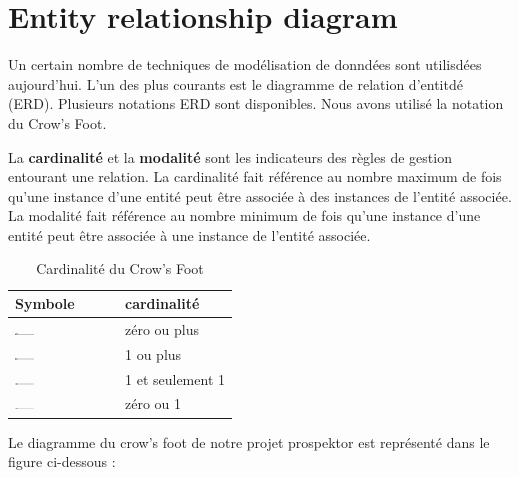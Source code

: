 \section{Entity relationship diagram}
Un certain nombre de techniques de mod\'elisation de donnd\'ees sont utilisd\'ees aujourd'hui. L'un des plus courants est le diagramme de relation d'entitd\'e (\gls{ERD}). Plusieurs notations \gls{ERD} sont disponibles. Nous avons utilis\'e la notation du Crow's Foot.

La \textbf{cardinalit\'e} et la \textbf{modalit\'e} sont les indicateurs des r\`egles de gestion entourant une relation. La cardinalit\'e fait r\'ef\'erence au nombre maximum de fois qu'une instance d'une entit\'e peut \^etre associ\'ee \`a des instances de l'entit\'e associ\'ee. La modalit\'e fait r\'ef\'erence au nombre minimum de fois qu'une instance d'une entit\'e peut \^etre associ\'ee \`a une instance de l'entit\'e associ\'ee.

\begin{table}[H]
\begin{center}
\begin{tabular}{ |l|l| }
\hline Symbole & cardinalit\'e \\ \hline \hline
\includegraphics[width=0.2\textwidth]{Figures/0+.png}
& z\'ero ou plus \\ \hline
\includegraphics[width=0.2\textwidth]{Figures/1+.png}
& 1 ou plus \\ \hline
\includegraphics[width=0.2\textwidth]{Figures/11.png}
& 1 et seulement 1 \\ \hline
\includegraphics[width=0.2\textwidth]{Figures/01.png}
& z\'ero ou 1 \\
\hline
\end{tabular}
\caption{Cardinalit\'e du Crow's Foot}
\end{center}
\end{table}

Le diagramme du crow's foot de notre projet prospektor est repr\'esent\'e dans le figure ci-dessous :

